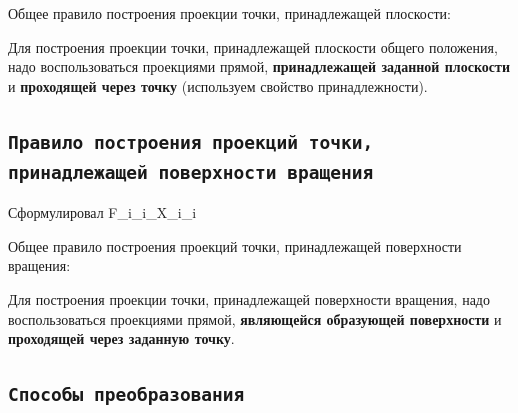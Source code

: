 Общее правило построения проекции точки, принадлежащей плоскости:

Для построения проекции точки, принадлежащей плоскости общего положения, надо воспользоваться проекциями прямой, {\bf принадлежащей заданной плоскости} и {\bf проходящей через точку} (используем свойство принадлежности).



\newpage
\subsection{\texttt{Правило построения проекций точки, принадлежащей поверхности вращения}}

\begin{myquote}
    \centering Сформулировал F\_i\_i\_X\_i\_i
\end{myquote}

Общее правило построения проекций точки, принадлежащей поверхности вращения:

Для построения проекции точки, принадлежащей поверхности вращения, надо воспользоваться проекциями прямой, {\bf являющейся образующей поверхности} и {\bf проходящей через заданную точку}. 


\newpage
\subsection{\texttt{Способы преобразования}}

\begin{myquote}
    
\end{myquote}


